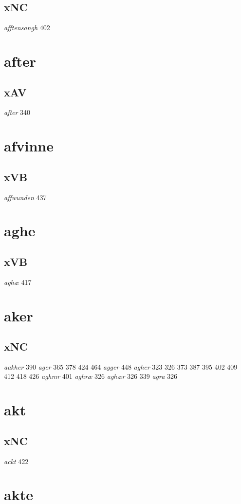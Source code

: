 \documentclass[a4paper,twocolumn]{article}
\begin{document}
\subsection{xNC}
\label{sec:org22339c5}
\emph{afftensangh} 402 
\section{after}
\label{sec:orga1298b3}
\subsection{xAV}
\label{sec:org8b224d9}
\emph{after} 340 
\section{afvinne}
\label{sec:orgd46c9c6}
\subsection{xVB}
\label{sec:orgd4346b6}
\emph{affwunden} 437 
\section{aghe}
\label{sec:org789ec2c}
\subsection{xVB}
\label{sec:org23e86bc}
\emph{aghæ} 417 
\section{aker}
\label{sec:org3f28011}
\subsection{xNC}
\label{sec:orgaedb56b}
\emph{aakher} 390 \emph{ager} 365 378 424 464 \emph{agger} 448 \emph{agher} 323 326 373 387 395 402 409 412 418 426 \emph{aghmr} 401 \emph{aghræ} 326 \emph{aghær} 326 339 \emph{agra} 326 
\section{akt}
\label{sec:org9905efa}
\subsection{xNC}
\label{sec:org207d79a}
\emph{ackt} 422 
\section{akte}
\label{sec:org7fb31ad}
\end{document}
